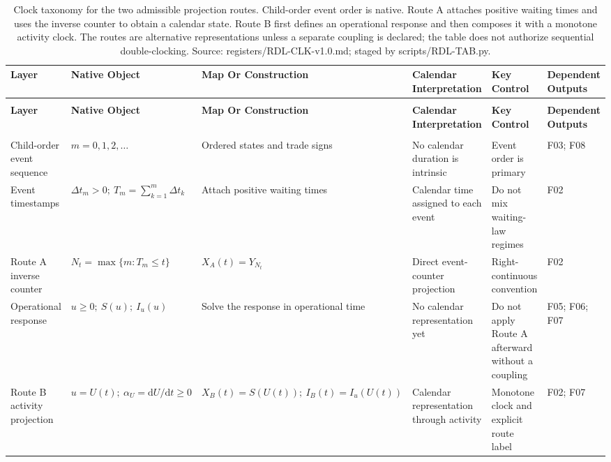 \documentclass[10pt,a4paper,landscape]{article}
\begin{document}
\footnotesize
\begin{longtable}{@{}>{\RaggedRight\arraybackslash}p{3.3cm}>{\RaggedRight\arraybackslash}p{4.3cm}>{\RaggedRight\arraybackslash}p{5.0cm}>{\RaggedRight\arraybackslash}p{5.0cm}>{\RaggedRight\arraybackslash}p{5.2cm}>{\RaggedRight\arraybackslash}p{2.6cm}@{}}
\caption{Clock taxonomy for the two admissible projection routes. Child-order event order is native. Route A attaches positive waiting times and uses the inverse counter to obtain a calendar state. Route B first defines an operational response and then composes it with a monotone activity clock. The routes are alternative representations unless a separate coupling is declared; the table does not authorize sequential double-clocking. Source: registers/RDL-CLK-v1.0.md; staged by scripts/RDL-TAB.py.}\label{tab:rdl-t02}\\
\toprule
\textbf{Layer} & \textbf{Native Object} & \textbf{Map Or Construction} & \textbf{Calendar Interpretation} & \textbf{Key Control} & \textbf{Dependent Outputs} \\
\midrule
\endfirsthead
\multicolumn{6}{l}{\tablename\ \thetable\ continued}\\
\toprule
\textbf{Layer} & \textbf{Native Object} & \textbf{Map Or Construction} & \textbf{Calendar Interpretation} & \textbf{Key Control} & \textbf{Dependent Outputs} \\
\midrule
\endhead
\midrule
\multicolumn{6}{r}{Continued on next page}\\
\endfoot
\bottomrule
\endlastfoot
Child-order event sequence & \(m=0,1,2,\ldots\) & Ordered states and trade signs & No calendar duration is intrinsic & Event order is primary & F03; F08 \\
Event timestamps & \(\Delta t_m>0;\ T_m=\sum_{k=1}^m\Delta t_k\) & Attach positive waiting times & Calendar time assigned to each event & Do not mix waiting-law regimes & F02 \\
Route A inverse counter & \(N_t=\max\{m:T_m\le t\}\) & \(X_A(t)=Y_{N_t}\) & Direct event-counter projection & Right-continuous convention & F02 \\
Operational response & \(u\ge0;\ S(u);\ I_u(u)\) & Solve the response in operational time & No calendar representation yet & Do not apply Route A afterward without a coupling & F05; F06; F07 \\
Route B activity projection & \(u=U(t);\ \alpha_U=\mathrm dU/\mathrm dt\ge0\) & \(X_B(t)=S(U(t));\ I_B(t)=I_u(U(t))\) & Calendar representation through activity & Monotone clock and explicit route label & F02; F07 \\
\end{longtable}
\end{document}
